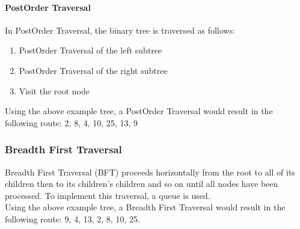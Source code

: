 \paragraph{PostOrder Traversal}
In PostOrder Traversal, the binary tree is traversed as follows:
\begin{enumerate}
    \item PostOrder Traversal of the left subtree
    \item PostOrder Traversal of the right subtree
    \item Visit the root node
\end{enumerate}
Using the above example tree, a PostOrder Traversal would result in the following route: 2, 8, 4, 10, 25, 13, 9

\subsubsection{Breadth First Traversal}
Breadth First Traversal (BFT) proceeds horizontally from the root to all of its children then to its children’s children and so on until all nodes have been processed. To implement this traversal, a queue is used.\\

Using the above example tree, a Breadth First Traversal would result in the following route: 9, 4, 13, 2, 8, 10, 25. 

